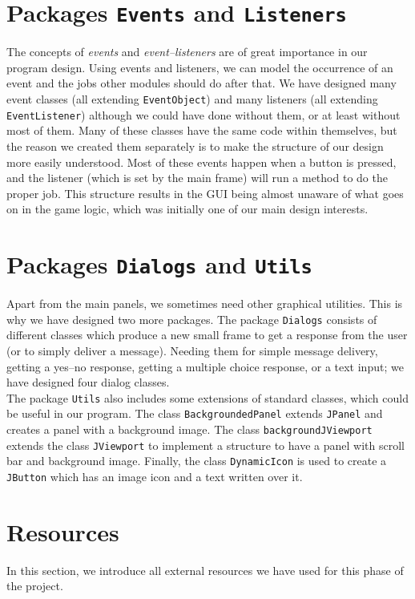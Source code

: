 \documentclass[a4paper]{article}
\begin{document}
\section{Packages \texttt{Events} and \texttt{Listeners}}
The concepts of \textit{events} and \textit{event--listeners} are of great importance in our program design. Using events and listeners, we can model the occurrence of an event and the jobs other modules should do after that. We have designed many event classes (all extending \texttt{EventObject}) and many listeners (all extending \texttt{EventListener}) although we could have done without them, or at least without most of them. Many of these classes have the same code within themselves, but the reason we created them separately is to make the structure of our design more easily understood. Most of these events happen when a button is pressed, and the listener (which is set by the main frame) will run a method to do the proper job. This structure results in the GUI being almost unaware of what goes on in the game logic, which was initially one of our main design interests.

\clearpage
\section{Packages \texttt{Dialogs} and \texttt{Utils}}
Apart from the main panels, we sometimes need other graphical utilities. This is why we have designed two more packages. The package \texttt{Dialogs} consists of different classes which produce a new small frame to get a response from the user (or to simply deliver a message). Needing them for simple message delivery, getting a yes--no response, getting a multiple choice response, or a text input; we have designed four dialog classes.\\

The package \texttt{Utils} also includes some extensions of standard classes, which could be useful in our program. The class \texttt{BackgroundedPanel} extends \texttt{JPanel} and creates a panel with a background image. The class \texttt{backgroundJViewport} extends the class \texttt{JViewport} to implement a structure to have a panel with scroll bar and background image. Finally, the class \texttt{DynamicIcon} is used to create a \texttt{JButton} which has an image icon and a text written over it.

\clearpage
\section{Resources}
In this section, we introduce all external resources we have used for this phase of the project.
\end{document}
